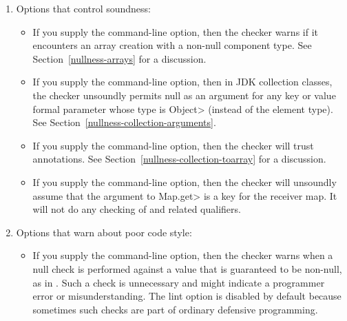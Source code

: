 \begin{enumerate}
\item
  Options that control soundness:

\begin{itemize}
\item
  \label{nullness-lint-soundArrayCreationNullness}%
  \label{nullness-lint-nonnullarraycomponents}%
  If you supply the  command-line
  option, then the checker warns if it encounters an array creation
  with a non-null component type.
  See Section~\ref{nullness-arrays} for a discussion.

\item
  \label{collection-object-parameters-may-be-null}
  If you supply the
  command-line option, then in JDK collection classes, the checker
  unsoundly permits null as an argument for any key or value formal
  parameter whose type is \<Object> (instead of the element type).
  See Section~\ref{nullness-collection-arguments}.

\item
  \label{nullness-lint-trustarraylenzero}%
  If you supply the  command-line option, then
  the checker will trust 
  annotations. See Section~\ref{nullness-collection-toarray} for a discussion.

\item
  \label{nullness-assumeKeyFor}%
  If you supply the  command-line option, then the
  checker will unsoundly assume that the argument to \<Map.get> is a key
  for the receiver map.  It will not do any checking of
   and related qualifiers.
\end{itemize}

\item
  Options that warn about poor code style:

\begin{itemize}
\item
  \label{nullness-lint-nulltest}%
  If you supply the  command-line option, then the
  checker warns when a null check is performed against a value that is
  guaranteed to be non-null, as in .  Such a check is
  unnecessary and might indicate a programmer error or misunderstanding.
  The lint option is disabled by default because sometimes such checks are
  part of ordinary defensive programming.
\end{itemize}


\end{enumerate}
